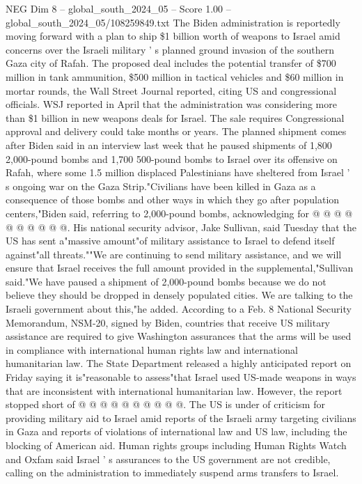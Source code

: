 \begin{textsample}{NEG Dim 8 – global\_south\_2024\_05 – Score 1.00 – global\_south\_2024\_05/108259849.txt}  \label{ex:f8_neg_240}
The Biden administration is reportedly moving forward with a plan to ship \$1 billion worth of weapons to Israel amid concerns over the Israeli military ' s planned ground invasion of the southern Gaza city of Rafah.
The proposed deal includes the potential transfer of \$700 million in tank ammunition, \$500 million in tactical vehicles and \$60 million in mortar rounds, the Wall Street Journal reported, citing US and congressional officials.
WSJ reported in April that the administration was considering more than \$1 billion in new weapons deals for Israel.
The sale requires Congressional approval and delivery could take months or years.
The planned shipment comes after Biden said in an interview last week that he paused shipments of 1,800 2,000-pound bombs and 1,700 500-pound bombs to Israel over its offensive on Rafah, where some 1.5 million displaced Palestinians have sheltered from Israel ' s ongoing war on the Gaza Strip."Civilians have been killed in Gaza as a consequence of those bombs and other ways in which they go after population centers,"Biden said, referring to 2,000-pound bombs, acknowledging for @ @ @ @ @ @ @ @ @ @.
His national security advisor, Jake Sullivan, said Tuesday that the US has sent a"massive amount"of military assistance to Israel to defend itself against"all threats.""We are continuing to send military assistance, and we will ensure that Israel receives the full amount provided in the supplemental,"Sullivan said."We have paused a shipment of 2,000-pound bombs because we do not believe they should be dropped in densely populated cities.
We are talking to the Israeli government about this,"he added.
According to a Feb. 8 National Security Memorandum, NSM-20, signed by Biden, countries that receive US military assistance are required to give Washington assurances that the arms will be used in compliance with international human rights law and international humanitarian law.
The State Department released a highly anticipated report on Friday saying it is"reasonable to assess"that Israel used US-made weapons in ways that are inconsistent with international humanitarian law.
However, the report stopped short of @ @ @ @ @ @ @ @ @ @.
The US is under of criticism for providing military aid to Israel amid reports of the Israeli army targeting civilians in Gaza and reports of violations of international law and US law, including the blocking of American aid.
Human rights groups including Human Rights Watch and Oxfam said Israel ' s assurances to the US government are not credible, calling on the administration to immediately suspend arms transfers to Israel.

\end{textsample}
